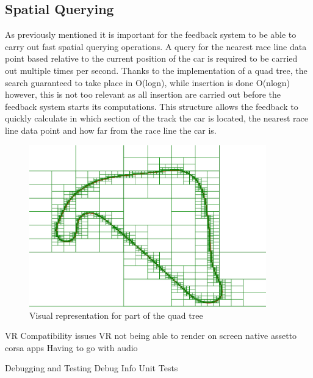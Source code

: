 \subsection{Spatial Querying}
As previously mentioned it is important for the feedback system to be able to carry out fast spatial querying operations. A query for the nearest race line data point based relative to the current position of the car is required to be carried out multiple times per second. Thanks to the implementation of a quad tree, the search guaranteed to take place in O(logn), while insertion is done O(nlogn) however, this is not too relevant as all insertion are carried out before the feedback system starts its computations. This structure allows the feedback to quickly calculate in which section of the track the car is located, the nearest race line data point and how far from the race line the car is.

\begin{figure}[!htb]
	\centering
	\includegraphics[height=7cm]{images/QuadTree}
	\caption{Visual representation for part of the quad tree}
	\label{fig:	QuadTree}
\end{figure}

VR Compatibility issues
VR not being able to render on screen native assetto corsa apps
Having to go with audio

Debugging and Testing
	Debug Info
	Unit Tests